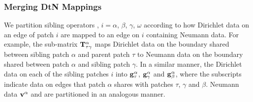 \subsubsection{Merging DtN Mappings} We partition sibling operators \Ti, $i=\alpha$, $\beta$, $\gamma$, $\omega$ according to how Dirichlet data on an edge of patch $i$ are mapped to an edge on $i$ containing Neumann data.  For example, the sub-matrix $\mathbf T^{\alpha}_{\tau\gamma}$ maps Dirichlet data on the boundary shared between sibling patch $\alpha$  and parent patch $\tau$ to Neumann data on the boundary shared between patch $\alpha$ and sibling patch $\gamma$. In a similar manner, the Dirichlet data on each of the sibling patches $i$ into $\mathbf g^{\alpha}_{\tau}$, $\mathbf g^{\alpha}_{\gamma}$ and $\mathbf g^{\alpha}_{\beta}$, where the subscripts indicate data on edges that patch $\alpha$ shares with patches $\tau$, $\gamma$ and $\beta$. Neumann data $\mathbf v^{\alpha}$ and \halpha are partitioned in an analogous manner. 

